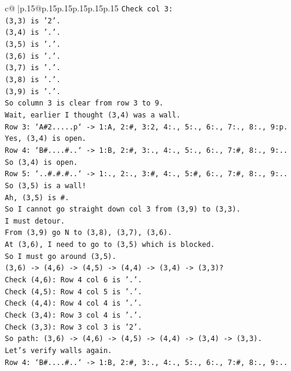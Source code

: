 \documentclass{article}
\begin{document}
{\begin{supertabular}{c@{$\;$}|p{.15\linewidth}@{}p{.15\linewidth}p{.15\linewidth}p{.15\linewidth}p{.15\linewidth}p{.15\linewidth}}
{{{\texttt{Check col 3:} \\
\texttt{(3,3) is '2'.} \\
\texttt{(3,4) is '.'.} \\
\texttt{(3,5) is '.'.} \\
\texttt{(3,6) is '.'.} \\
\texttt{(3,7) is '.'.} \\
\texttt{(3,8) is '.'.} \\
\texttt{(3,9) is '.'.} \\
\texttt{So column 3 is clear from row 3 to 9.} \\
\texttt{Wait, earlier I thought (3,4) was a wall.} \\
\texttt{Row 3: `A\#2.....p` {-}> 1:A, 2:\#, 3:2, 4:., 5:., 6:., 7:., 8:., 9:p.} \\
\texttt{Yes, (3,4) is open.} \\
\texttt{Row 4: `B\#....\#..` {-}> 1:B, 2:\#, 3:., 4:., 5:., 6:., 7:\#, 8:., 9:..} \\
\texttt{So (3,4) is open.} \\
\texttt{Row 5: `..\#.\#.\#..` {-}> 1:., 2:., 3:\#, 4:., 5:\#, 6:., 7:\#, 8:., 9:..} \\
\texttt{So (3,5) is a wall!} \\
\texttt{Ah, (3,5) is \#.} \\
\texttt{So I cannot go straight down col 3 from (3,9) to (3,3).} \\
\texttt{I must detour.} \\
\texttt{From (3,9) go N to (3,8), (3,7), (3,6).} \\
\texttt{At (3,6), I need to go to (3,5) which is blocked.} \\
\texttt{So I must go around (3,5).} \\
\texttt{(3,6) {-}> (4,6) {-}> (4,5) {-}> (4,4) {-}> (3,4) {-}> (3,3)?} \\
\texttt{Check (4,6): Row 4 col 6 is '.'.} \\
\texttt{Check (4,5): Row 4 col 5 is '.'.} \\
\texttt{Check (4,4): Row 4 col 4 is '.'.} \\
\texttt{Check (3,4): Row 3 col 4 is '.'.} \\
\texttt{Check (3,3): Row 3 col 3 is '2'.} \\
\texttt{So path: (3,6) {-}> (4,6) {-}> (4,5) {-}> (4,4) {-}> (3,4) {-}> (3,3).} \\
\texttt{Let's verify walls again.} \\
\texttt{Row 4: `B\#....\#..` {-}> 1:B, 2:\#, 3:., 4:., 5:., 6:., 7:\#, 8:., 9:..} \\
}}}
\end{supertabular}}
\end{document}
